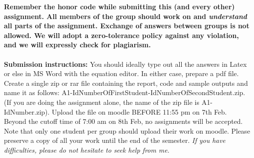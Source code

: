 \documentclass[11pt]{article}
\begin{document}
\maketitle

\textbf{Remember the honor code while submitting this (and every other) assignment. All members of the group should work on and \emph{understand} all parts of the assignment. Exchange of answers between groups is not allowed. We will adopt a \textbf{zero-tolerance policy} against any violation, and we will expressly check for plagiarism.}
\\
\\
\textbf{Submission instructions:} You should ideally type out all the answers in Latex or else in MS Word with the equation editor. In either case, prepare a pdf file. Create a single zip or rar file containing the report, code and sample outputs and name it as follows: A1-IdNumberOfFirstStudent-IdNumberOfSecondStudent.zip. (If you are doing the assignment alone, the name of the zip file is A1-IdNumber.zip). Upload the file on moodle BEFORE 11:55 pm on 7th Feb. Beyond the cutoff time of 7:00 am on 8th Feb, no assignments will be accepted. Note that only one student per group should upload their work on moodle. Please preserve a copy of all your work until the end of the semester. \emph{If you have difficulties, please do not hesitate to seek help from me.} 
\end{document}
